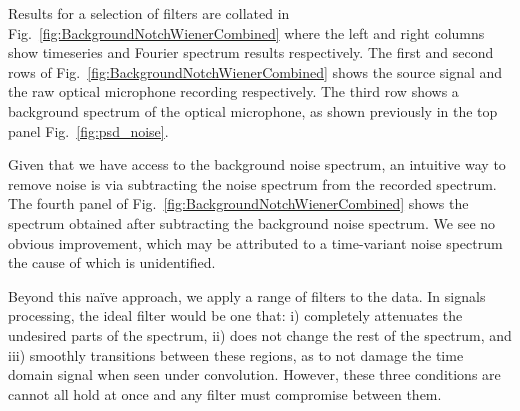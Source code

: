 \documentclass[paper-main.tex]{subfiles}
\begin{document}

Results for a selection of filters are collated in Fig.~\ref{fig:BackgroundNotchWienerCombined} where the left and right columns show timeseries and Fourier spectrum results respectively. 
The first and second rows of Fig.~\ref{fig:BackgroundNotchWienerCombined} shows the source signal and the raw optical microphone recording respectively. 
The third row shows a background spectrum of the optical microphone, as shown previously in the top panel Fig.~\ref{fig:psd_noise}.


Given that we have access to the background noise spectrum, an intuitive way to remove noise is via subtracting the noise spectrum from the recorded spectrum. 
The fourth panel of Fig.~\ref{fig:BackgroundNotchWienerCombined} shows the spectrum obtained after subtracting the background noise spectrum. 
We see no obvious improvement, which may be attributed to a time-variant noise spectrum the cause of which is unidentified. %


Beyond this na\"{i}ve approach, we apply a range of filters to the data.
In signals processing, the ideal filter would be one that:
i) completely attenuates the undesired parts of the spectrum, 
ii) does not change the rest of the spectrum, and 
iii) smoothly transitions between these regions, as to not damage the time domain signal when seen under convolution. 
However, these three conditions are cannot all hold at once and any filter must compromise between them. 
\end{document}

